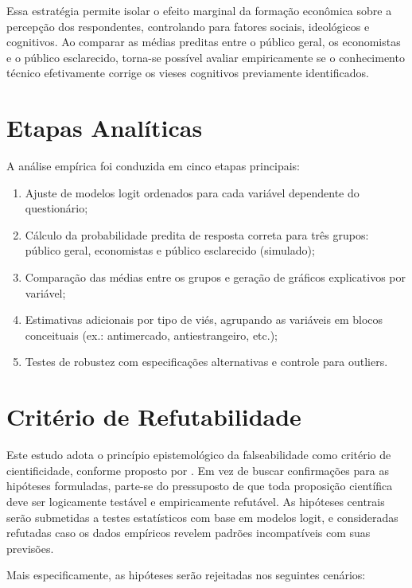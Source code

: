 Essa estratégia permite isolar o efeito marginal da formação econômica sobre a percepção dos respondentes, controlando para fatores sociais, ideológicos e cognitivos. Ao comparar as médias preditas entre o público geral, os economistas e o público esclarecido, torna-se possível avaliar empiricamente se o conhecimento técnico efetivamente corrige os vieses cognitivos previamente identificados.

\section{Etapas Analíticas}

A análise empírica foi conduzida em cinco etapas principais:
\begin{enumerate}
    \item Ajuste de modelos logit ordenados para cada variável dependente do questionário;
    \item Cálculo da probabilidade predita de resposta correta para três grupos: público geral, economistas e público esclarecido (simulado);
    \item Comparação das médias entre os grupos e geração de gráficos explicativos por variável;
    \item Estimativas adicionais por tipo de viés, agrupando as variáveis em blocos conceituais (ex.: antimercado, antiestrangeiro, etc.);
    \item Testes de robustez com especificações alternativas e controle para outliers.
\end{enumerate}

\section{Critério de Refutabilidade}

Este estudo adota o princípio epistemológico da falseabilidade como critério de cientificidade, conforme proposto por . Em vez de buscar confirmações para as hipóteses formuladas, parte-se do pressuposto de que toda proposição científica deve ser logicamente testável e empiricamente refutável. As hipóteses centrais serão submetidas a testes estatísticos com base em modelos logit, e consideradas refutadas caso os dados empíricos revelem padrões incompatíveis com suas previsões.

Mais especificamente, as hipóteses serão rejeitadas nos seguintes cenários:

